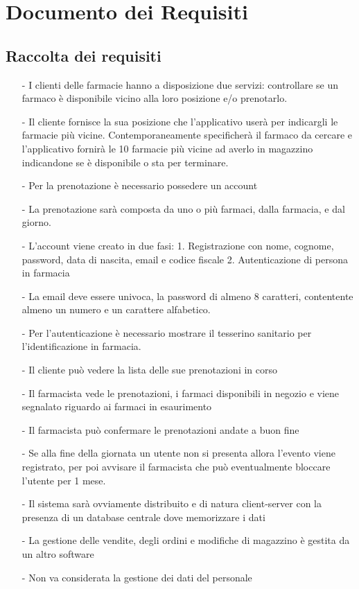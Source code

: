 \newpage
\section{Documento dei Requisiti}

\subsection{Raccolta dei requisiti}

\begin{itemize}
  \item[-] I clienti delle farmacie hanno a disposizione due servizi: controllare se un farmaco è disponibile vicino alla loro posizione e/o prenotarlo.
  \item[-] Il cliente fornisce la sua posizione che l'applicativo userà per indicargli le farmacie più vicine. Contemporaneamente specificherà il farmaco da cercare e l'applicativo fornirà le 10 farmacie più vicine ad averlo in magazzino indicandone se è disponibile o sta per terminare.
  \item[-] Per la prenotazione è necessario possedere un account
  \item[-] La prenotazione sarà composta da uno o più farmaci, dalla farmacia, e dal giorno. 
  \item[-] L'account viene creato in due fasi:
      1. Registrazione con nome, cognome, password, data di nascita, email e codice fiscale
      2. Autenticazione di persona in farmacia
  \item[-] La email deve essere univoca, la password di almeno 8 caratteri, contentente almeno un numero e un carattere alfabetico.
  \item[-] Per l'autenticazione è necessario mostrare il tesserino sanitario per l'identificazione in farmacia.
  \item[-] Il cliente può vedere la lista delle sue prenotazioni in corso
  \item[-] Il farmacista vede le prenotazioni, i farmaci disponibili in negozio e viene segnalato riguardo ai farmaci in esaurimento
  \item[-] Il farmacista può confermare le prenotazioni andate a buon fine
  \item[-] Se alla fine della giornata un utente non si presenta allora l'evento viene registrato, per poi avvisare il farmacista che può eventualmente bloccare l'utente per 1 mese.
  \item[-] Il sistema sarà ovviamente distribuito e di natura client-server con la presenza di un database centrale dove memorizzare i dati
  \item[-] La gestione delle vendite, degli ordini e modifiche di magazzino è gestita da un altro software
  \item[-] Non va considerata la gestione dei dati del personale 
\end{itemize}


